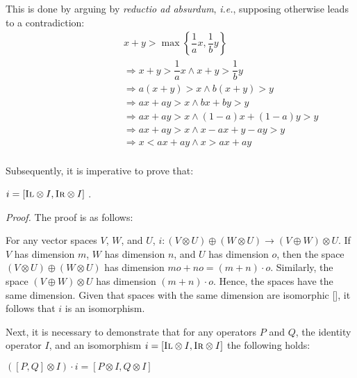 This is done by arguing by \textit{reductio ad absurdum}, \textit{i.e.}, supposing otherwise leads to a contradiction:
\begin{equation} 
\begin{split} 
    \hspace{90pt}&
     x + y  >  \max \left\{   \dfrac{1}{a}x  ,   \dfrac{1}{b} y   \right\} \\
    & \Rightarrow  x + y > \dfrac{1}{a}x  \wedge x + y > \dfrac{1}{b}y \\
    & \Rightarrow  a (x + y) > x  \wedge b (x + y)> y \\
    & \Rightarrow  a x + a y > x  \wedge b x + by > y \\
    & \Rightarrow  a x + a y > x  \wedge (1-a) x + (1-a)y > y\\
    & \Rightarrow  a x + a y > x  \wedge x-ax + y -ay > y\\
    & \Rightarrow  x < a x + a y   \wedge x > a x + a y  \\
\end{split}
\end{equation}

\vspace{10pt}

Subsequently, it is imperative to prove that:
\begin{lemma}\label{lemiso}
  $ i= [\textsc{Il} \otimes I, \textsc{Ir} \otimes I ]$ .
\end{lemma}

\textit{Proof.} \quad The proof is as follows:

For any vector spaces $V$, $W$, and $U$, $i: (V \otimes U) \oplus (W \otimes U) \xrightarrow{} (V  \oplus W) \otimes U $. If $V$ has dimension $m$, $W$ has dimension $n$, and $U$ has dimension $o$, then the space $(V \otimes U) \oplus (W \otimes U) $ has dimension $mo+no=(m+n)\cdot o$. Similarly, the space $(V\oplus W) \otimes U$ has dimension $(m+n)\cdot o$. Hence, the spaces have the same dimension. Given that spaces with the same dimension are isomorphic [\cite{hefferon2006linear}], it follows that $i$ is an isomorphism.

\vspace{10pt}

Next, it is necessary to demonstrate that for any operators $P$ and $Q$, the identity operator $I$, and an isomorphism $i=[\textsc{Il} \otimes I, \textsc{Ir} \otimes I ]$ the following holds:

\begin{lemma}\label{lem2}
  $( [P,Q] \otimes I) \cdot  i  = [P \otimes I, Q \otimes I]$
\end{lemma}

